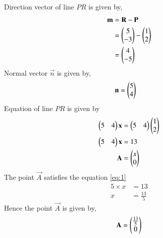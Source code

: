 \documentclass[journal,12pt,twocolumn]{IEEEtran}
\begin{document}
\begin{enumerate}
\begin{enumerate}
Direction vector of line $PR$ is given by,
\begin{align}
\mathbf{m} &= \mathbf{R} - \mathbf{P}\\
&= \begin{pmatrix}5\\-3\end{pmatrix} - \begin{pmatrix}1\\2\end{pmatrix}\\
&= \begin{pmatrix}4\\-5\end{pmatrix}
\end{align}
Normal vector $\vec{n}$ is given by,
\begin{align}
\mathbf{n} &= \begin{pmatrix}5\\4\end{pmatrix}
\end{align}
Equation of line $PR$ is given by
\begin{align}
\begin{pmatrix}5&4\end{pmatrix}\mathbf{x} &= \begin{pmatrix}5&4\end{pmatrix}\begin{pmatrix}1\\2\end{pmatrix}\\
\begin{pmatrix}5&4\end{pmatrix}\mathbf{x} &= 13
\label{eq:1}\\
\mathbf{A} &= \begin{pmatrix}x\\0\end{pmatrix}
\end{align}
The point $\vec{A}$ satisfies the equation \eqref{eq:1}
\begin{align}
5\times x &= 13\\
x &= \frac{13}{5}
\end{align}
Hence the point $\vec{A}$ is given by,
\begin{align}
\mathbf{A} = \begin{pmatrix}\frac{13}{5}\\0\end{pmatrix}
\end{align}
\end{enumerate}
\end{enumerate}
\end{document}
